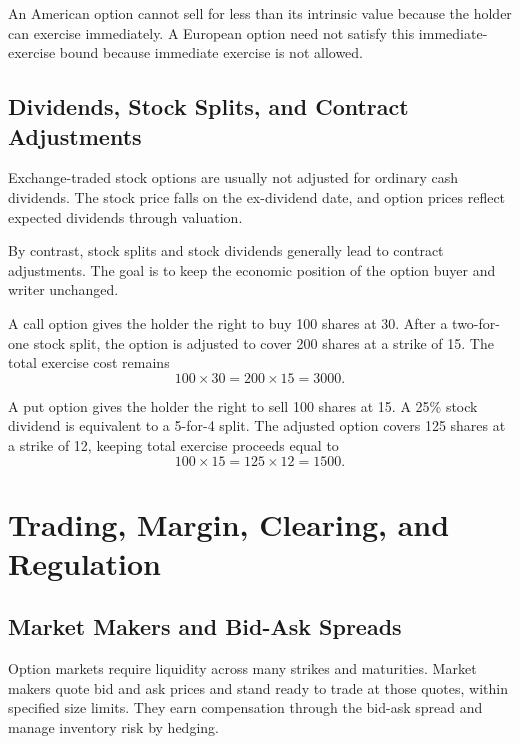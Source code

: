 An American option cannot sell for less than its intrinsic value because the
holder can exercise immediately. A European option need not satisfy this
immediate-exercise bound because immediate exercise is not allowed.

\subsection{Dividends, Stock Splits, and Contract Adjustments}

Exchange-traded stock options are usually not adjusted for ordinary cash
dividends. The stock price falls on the ex-dividend date, and option prices
reflect expected dividends through valuation.

By contrast, stock splits and stock dividends generally lead to contract
adjustments. The goal is to keep the economic position of the option buyer and
writer unchanged.

\begin{exmp}
A call option gives the holder the right to buy 100 shares at 30. After a
two-for-one stock split, the option is adjusted to cover 200 shares at a strike
of 15. The total exercise cost remains
\[
    100 \times 30 = 200 \times 15 = 3000.
\]
\end{exmp}

\begin{exmp}
A put option gives the holder the right to sell 100 shares at 15. A 25\% stock
dividend is equivalent to a 5-for-4 split. The adjusted option covers 125 shares
at a strike of 12, keeping total exercise proceeds equal to
\[
    100 \times 15 = 125 \times 12 = 1500.
\]
\end{exmp}

\section{Trading, Margin, Clearing, and Regulation}

\subsection{Market Makers and Bid-Ask Spreads}

Option markets require liquidity across many strikes and maturities. Market
makers quote bid and ask prices and stand ready to trade at those quotes, within
specified size limits. They earn compensation through the bid-ask spread and
manage inventory risk by hedging.

